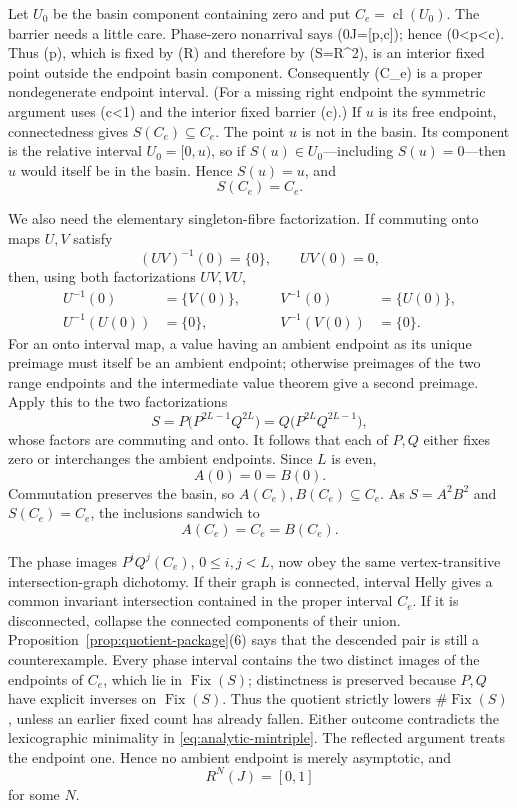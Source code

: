 \documentclass[11pt]{article}
\theoremstyle{definition}
\theoremstyle{remark}
\newcommand{\I}{[0,1]}
\newcommand{\Fix}{\operatorname{Fix}}
\newcommand{\cl}{\operatorname{cl}}
\begin{document}
Let \(U_0\) be the basin component containing zero and put
\(C_e=\cl(U_0)\).  The barrier needs a little care.  Phase-zero nonarrival
says (0\notin J=[p,c]); hence (0<p<c).  Thus (p), which is fixed by
(R) and therefore by (S=R^2), is an interior fixed point outside the
endpoint basin component.  Consequently (C_e) is a proper nondegenerate
endpoint interval.  (For a missing right endpoint the symmetric argument
uses (c<1) and the interior fixed barrier (c).)  If \(u\) is its free
endpoint, connectedness gives \(S(C_e)\subseteq C_e\).  The point \(u\) is
not in the basin.  Its component is the relative interval
\(U_0=[0,u)\), so if \(S(u)\in U_0\)---including \(S(u)=0\)---then \(u\)
would itself be in the basin.  Hence \(S(u)=u\), and
\begin{equation}\label{eq:analytic-basin-onto}
 S(C_e)=C_e.
\end{equation}

We also need the elementary singleton-fibre factorization.  If commuting
onto maps \(U,V\) satisfy
\[
 (UV)^{-1}(0)=\{0\},\qquad UV(0)=0,
\]
then, using both factorizations \(UV,VU\),
\[
\begin{alignedat}{2}
 U^{-1}(0)&=\{V(0)\},\qquad&V^{-1}(0)&=\{U(0)\},\\
 U^{-1}(U(0))&=\{0\},&V^{-1}(V(0))&=\{0\}.
\end{alignedat}
\]
For an onto interval map, a value having an ambient endpoint as its unique
preimage must itself be an ambient endpoint; otherwise preimages of the two
range endpoints and the intermediate value theorem give a second preimage.
Apply this to the two factorizations
\[
 S=P\bigl(P^{2L-1}Q^{2L}\bigr)
  =Q\bigl(P^{2L}Q^{2L-1}\bigr),
\]
whose factors are commuting and onto.  It follows that each of \(P,Q\)
either fixes zero or interchanges the ambient endpoints.  Since \(L\) is even,
\[
 A(0)=0=B(0).
\]
Commutation preserves the basin, so \(A(C_e),B(C_e)\subseteq C_e\).  As
\(S=A^2B^2\) and \(S(C_e)=C_e\), the inclusions sandwich to
\[
 A(C_e)=C_e=B(C_e).
\]

The phase images \(P^iQ^j(C_e)\), \(0\leq i,j<L\), now obey the same
vertex-transitive intersection-graph dichotomy.  If their graph is
connected, interval Helly gives a common invariant intersection contained in
the proper interval \(C_e\).  If it is disconnected, collapse the connected
components of their union.  Proposition~\ref{prop:quotient-package}(6) says
that the descended pair is still a counterexample.  Every phase interval
contains the two distinct
images of the endpoints of \(C_e\), which lie in \(\Fix(S)\); distinctness
is preserved because \(P,Q\) have explicit inverses on \(\Fix(S)\).
Thus the quotient strictly lowers \(\#\Fix(S)\), unless an earlier fixed
count has already fallen.  Either outcome contradicts the lexicographic
minimality in \eqref{eq:analytic-mintriple}.  The reflected argument treats
the endpoint one.  Hence no ambient endpoint is merely asymptotic, and
\begin{equation}\label{eq:analytic-finite-arrival}
 R^N(J)=\I
\end{equation}
for some \(N\).
\end{document}
